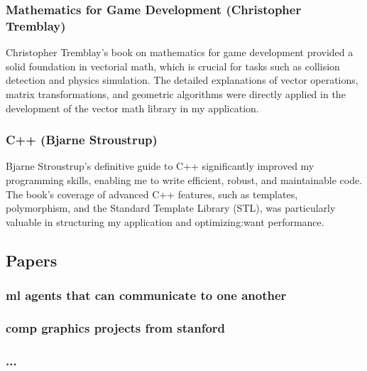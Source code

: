                     \subsubsection{Mathematics for Game Development (Christopher Tremblay)}
                        Christopher Tremblay's book on
                        mathematics for game development provided a solid
                        foundation in vectorial math, which is crucial for tasks
                        such as collision detection and physics simulation. The
                        detailed explanations of vector operations, matrix
                        transformations, and geometric algorithms were directly
                        applied in the development of the vector math library in
                        my application.
                    \subsubsection{C++ (Bjarne Stroustrup)}
                        Bjarne Stroustrup's definitive
                        guide to C++ significantly improved my programming
                        skills, enabling me to write efficient, robust, and
                        maintainable code. The book's coverage of advanced C++
                        features, such as templates, polymorphism, and the
                        Standard Template Library (STL), was particularly
                        valuable in structuring my application and optimizing:want
                        performance.
                \subsection{Papers}
                    \subsubsection{ml agents that can communicate to one another}
                    \subsubsection{comp graphics projects from stanford}
                    \subsubsection{...}

